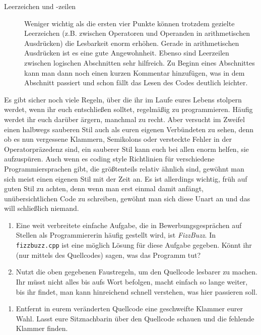\begin{description}
    \item[Leerzeichen und -zeilen]
          Weniger wichtig als die ersten vier Punkte können trotzdem gezielte
          Leerzeichen (z.B. zwischen Operatoren und Operanden in arithmetischen
          Ausdrücken) die Lesbarkeit enorm erhöhen. Gerade in arithmetischen
          Ausdrücken ist es eine gute Angewohnheit.
          Ebenso sind Leerzeilen zwischen logischen Abschnitten sehr hilfreich. Zu Beginn eines Abschnittes kann man dann noch einen kurzen Kommentar hinzufügen, was in dem Abschnitt passiert und schon fällt das Lesen des Codes deutlich leichter.
\end{description}

Es gibt sicher noch viele Regeln, über die ihr im Laufe eures Lebens stolpern
werdet, wenn ihr euch entschließen solltet, regelmäßig zu programmieren. Häufig
werdet ihr euch darüber ärgern, manchmal zu recht. Aber versucht im Zweifel
einen halbwegs sauberen Stil auch als euren eigenen Verbündeten zu sehen, denn
ob es nun vergessene Klammern, Semikolons oder versteckte Fehler in der
Operatorpräzedenz sind, ein sauberer Stil kann euch bei allen enorm helfen, sie
aufzuspüren. Auch wenn es coding style Richtlinien für verschiedene Programmiersprachen gibt, die größtenteils relativ ähnlich sind, gewöhnt man sich meist einen eigenen Stil mit der Zeit an. Es ist allerdings wichtig, früh auf guten Stil zu achten, denn wenn man erst einmal damit anfängt, unübersichtlichen Code zu schreiben, gewöhnt man sich diese Unart an und das will schließlich niemand.

\begin{praxis}
    \begin{enumerate}
        \item Eine weit verbreitete einfache Aufgabe, die in Bewerbungsgesprächen
              auf Stellen als Programmiererin häufig gestellt wird, ist
              \emph{FizzBuzz}. In \texttt{fizzbuzz.cpp} ist eine möglich Lösung für
              diese Aufgabe gegeben. Könnt ihr (nur mittels des Quellcodes) sagen,
              was das Programm tut?
        \item Nutzt die oben gegebenen Faustregeln, um den Quellcode lesbarer zu
              machen. Ihr müsst nicht alles bis aufs Wort befolgen, macht einfach so
              lange weiter, bis ihr findet, man kann hinreichend schnell verstehen,
              was hier passieren soll.
    \end{enumerate}


\end{praxis}

\begin{spiel}
    \begin{enumerate}
        \item Entfernt in eurem veränderten Quellcode eine geschweifte Klammer
              eurer Wahl. Lasst eure Sitznachbarin über den Quellcode schauen und die
              fehlende Klammer finden.
    \end{enumerate}
\end{spiel}
